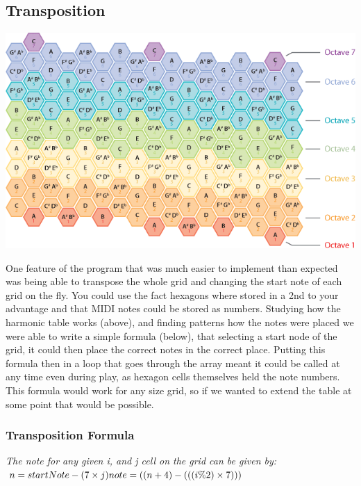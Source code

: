 \documentclass[10pt,a4paper]{article}
\begin{document}
\subsection{Transposition}
\begin{center}
\includegraphics[scale=0.5]{7.png}
\end{center}
One feature of the program that was much easier to implement than expected was being able to transpose the whole grid and changing the start note of each grid on the fly. You could use the fact hexagons where stored in a 2nd to your advantage and that MIDI notes could be stored as numbers. Studying how the harmonic table works (above), and finding patterns how the notes were placed we were able to write a simple formula (below), that selecting a start node of the grid, it could then place the correct notes in the correct place. Putting this formula then in a loop that goes through the array meant it could be called at any time even during play, as hexagon cells themselves held the note numbers. This formula would work for any size grid, so if we wanted to extend the table at some point that would be possible. \\

\subsubsection{Transposition Formula}
\begin{center}
\textit{The note for any given i, and j cell on the grid can be given by:}\\
$ n = startNote - (7 \times j) \linebreak note = ((n + 4) - ((( i \% 2) \times 7))) $
\end{center}
\end{document}
